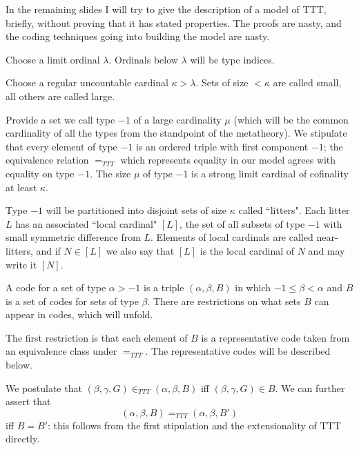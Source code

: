 \documentclass{slides}
\begin{document}
\begin{slide}

In the remaining slides I will try to give the description of a model of TTT, briefly, without proving that it has stated properties.  The proofs are nasty, and the coding techniques going into building the model are nasty.

Choose a limit ordinal $\lambda$.  Ordinals below $\lambda$ will be type indices.

Choose a regular uncountable cardinal $\kappa>\lambda$.  Sets of size $<\kappa$ are called small, all others are called large.

Provide a set we call type $-1$ of a large cardinality $\mu$ (which will be the common cardinality of all the types from the standpoint of the metatheory).  We stipulate that every element of type $-1$ is an ordered triple with first component $-1$;
the equivalence relation $=_{TTT}$ which represents equality in our model agrees with equality on type $-1$.  The size $\mu$ of type $-1$ is a strong limit cardinal of cofinality at least $\kappa$.

Type $-1$ will be partitioned into disjoint sets of size $\kappa$ called ``litters".  Each litter $L$  has an associated ``local cardinal" $[L]$, the set of all subsets of type $-1$ with small symmetric difference from $L$.  Elements of local cardinals are called near-litters, and if $N \in [L]$ we also say that $[L]$ is the local cardinal of $N$ and may write it $[N]$.

\end{slide}

\begin{slide}

A code for a set of type $\alpha>-1$ is a triple $(\alpha,\beta,B)$ in which $-1\leq \beta<\alpha$ and $B$ is a set of codes for sets of type $\beta$.  There are restrictions on what sets $B$ can appear in codes, which will unfold.

The first restriction is that each element of $B$ is a representative code taken from an equivalence class under $=_{TTT}$.  The representative codes will be described below.

We postulate that $(\beta,\gamma,G) \in_{TTT} (\alpha,\beta,B)$ iff $(\beta,\gamma,G) \in B$.  We can further assert
that $$(\alpha,\beta,B) =_{TTT} (\alpha,\beta,B')$$ iff $B=B'$:  this follows from the first stipulation and the extensionality of TTT directly.

\end{slide}
\end{document}
